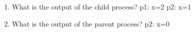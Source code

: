 \documentclass{article}
\begin{document}
\begin{enumerate}[label=\textbf{\Alph*.}]
	\item What is the output of the child process?
	p1: x=2
	p2: x=1
	\item What is the output of the parent process?
	p2: x=0
\end{enumerate}
\end{document}
